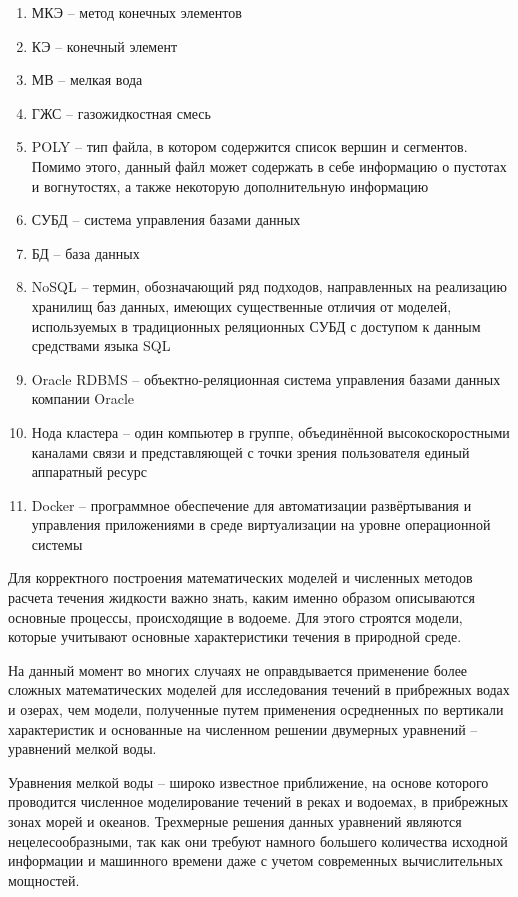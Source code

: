 \documentclass[14pt]{extreport}
\begin{document}


\tableofcontents

\abbrevdef

\begin{enumerate}
\item МКЭ -- метод конечных элементов
\item КЭ -- конечный элемент
\item МВ -- мелкая вода
\item ГЖС -- газожидкостная смесь
\item POLY -- тип файла, в котором содержится список вершин и сегментов. Помимо этого, данный файл может содержать в себе информацию о пустотах и вогнутостях, а также некоторую дополнительную информацию\cite{bib:website:quake:triangle}
\item СУБД -- система управления базами данных
\item БД -- база данных
\item NoSQL -- термин, обозначающий ряд подходов, направленных на реализацию хранилищ баз данных, имеющих существенные отличия от моделей, используемых в традиционных реляционных СУБД с доступом к данным средствами языка SQL
\item Oracle RDBMS -- объектно-реляционная система управления базами данных компании Oracle
\item Нода кластера -- один компьютер в группе, объединённой высокоскоростными каналами связи и представляющей с точки зрения пользователя единый аппаратный ресурс
\item Docker -- программное обеспечение для автоматизации развёртывания и управления приложениями в среде виртуализации на уровне операционной системы
\end{enumerate}

\intro

Для корректного построения математических моделей и численных методов расчета течения жидкости важно знать, каким именно образом описываются основные процессы, происходящие в водоеме. Для этого строятся модели, которые учитывают основные характеристики течения в природной среде.

На данный момент во многих случаях не оправдывается применение более сложных математических моделей для исследования течений в прибрежных водах и озерах, чем модели, полученные путем применения осредненных по вертикали характеристик и основанные на численном решении двумерных уравнений -- уравнений мелкой воды.

Уравнения мелкой воды -- широко известное приближение, на основе которого проводится численное моделирование течений в реках и водоемах, в прибрежных зонах морей и океанов. Трехмерные решения данных уравнений являются нецелесообразными, так как они требуют намного большего количества исходной информации и машинного времени даже с учетом современных вычислительных мощностей.
\end{document}
